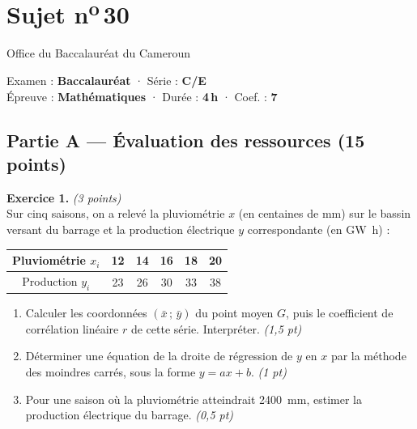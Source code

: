 \section{Sujet n\textsuperscript{o}\,30}
\noindent\begin{minipage}{0.5\linewidth}\footnotesize Office du Baccalauréat du Cameroun\end{minipage}%
\hfill\begin{minipage}{0.45\linewidth}\footnotesize\raggedleft Examen : \textbf{Baccalauréat} · Série : \textbf{C/E}\\
Épreuve : \textbf{Mathématiques} · Durée : \textbf{4\,h} · Coef. : \textbf{7}\end{minipage}
\par\smallskip{\color{onbo}\rule{\linewidth}{1pt}}

\par\smallskip{}

\subsection*{Partie A — Évaluation des ressources \hfill (15 points)}

\noindent\textbf{Exercice 1.} \hfill\textit{(3 points)}\\
Sur cinq saisons, on a relevé la pluviométrie $x$ (en centaines de \si{\milli\metre}) sur le bassin
versant du barrage et la production électrique $y$ correspondante (en \si{\giga\watt\hour}) :
\begin{center}\small
\begin{tabular}{|c|*{5}{c|}}\hline
Pluviométrie $x_i$ & 12 & 14 & 16 & 18 & 20\\\hline
Production $y_i$ & 23 & 26 & 30 & 33 & 38\\\hline
\end{tabular}
\end{center}
\begin{enumerate}[label=\arabic*)]
\item Calculer les coordonnées $(\bar x\,;\,\bar y)$ du point moyen $G$, puis le coefficient de
corrélation linéaire $r$ de cette série. Interpréter. \hfill\textit{(1,5 pt)}
\item Déterminer une équation de la droite de régression de $y$ en $x$ par la méthode des moindres
carrés, sous la forme $y=ax+b$. \hfill\textit{(1 pt)}
\item Pour une saison où la pluviométrie atteindrait \SI{2400}{\milli\metre}, estimer la production
électrique du barrage. \hfill\textit{(0,5 pt)}
\end{enumerate}

